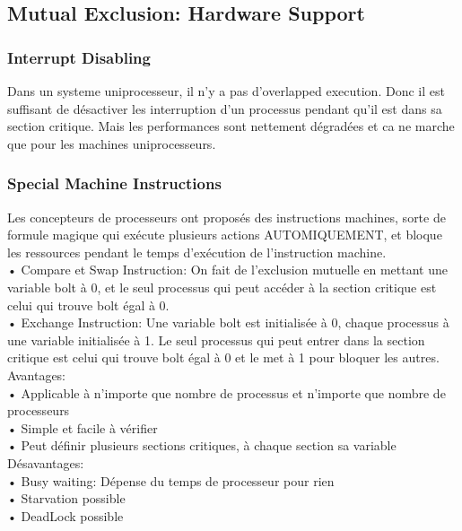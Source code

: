 \subsection{Mutual Exclusion: Hardware Support}
\subsubsection{Interrupt Disabling}
Dans un systeme uniprocesseur, il n'y a pas d'overlapped execution. Donc il est suffisant de désactiver les interruption d'un processus pendant qu'il est dans sa section critique. Mais les performances sont nettement dégradées et ca ne marche que pour les machines uniprocesseurs.
\subsubsection{Special Machine Instructions}
Les concepteurs de processeurs ont proposés des instructions machines, sorte de formule magique qui exécute plusieurs actions AUTOMIQUEMENT, et bloque les ressources pendant le temps d'exécution de l'instruction machine. \\
• Compare et Swap Instruction: On fait de l'exclusion mutuelle en mettant une variable bolt à 0, et le seul processus qui peut accéder à la section critique est celui qui trouve bolt égal à 0. \\
• Exchange Instruction: Une variable bolt est initialisée à 0, chaque processus à une variable initialisée à 1. Le seul processus qui peut entrer dans la section critique est celui qui trouve bolt égal à 0 et le met à 1 pour bloquer les autres. \\
Avantages: \\
• Applicable à n'importe que nombre de processus et n'importe que nombre de processeurs \\
• Simple et facile à vérifier \\
• Peut définir plusieurs sections critiques, à chaque section sa variable Désavantages: \\
• Busy waiting: Dépense du temps de processeur pour rien  \\
• Starvation possible\\
• DeadLock possible \\
